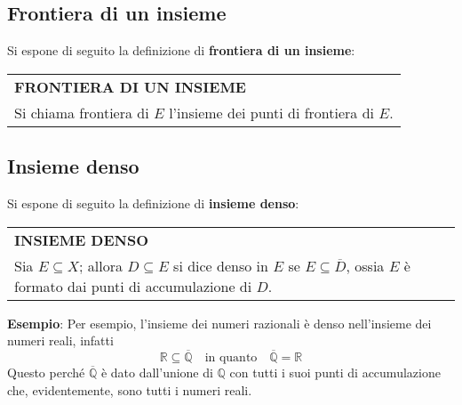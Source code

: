 \documentclass[a4paper]{extarticle}
\renewcommand\arraystretch{}
\begin{document}
\vspace{1em}
\noindent
\subsection{Frontiera di un insieme}
Si espone di seguito la definizione di \textbf{frontiera di un insieme}:

\vspace{1em}
\setlength{\tabcolsep}{14pt}
\renewcommand{\arraystretch}{2}
\noindent
\begin{tabularx}{\textwidth}{@{}|P|@{}}
    \hline
    {\textbf{FRONTIERA DI UN INSIEME}}\\
    \parbox{\linewidth}{Si chiama frontiera di $E$ l'insieme dei punti di frontiera di $E$.
    \vspace{3mm}}\\
    \hline
\end{tabularx}

\newpage
\noindent
\subsection{Insieme denso}
Si espone di seguito la definizione di \textbf{insieme denso}:

\vspace{1em}
\setlength{\tabcolsep}{14pt}
\renewcommand{\arraystretch}{2}
\noindent
\begin{tabularx}{\textwidth}{@{}|P|@{}}
    \hline
    {\textbf{INSIEME DENSO}}\\
    \parbox{\linewidth}{Sia $E \subseteq X$; allora $D \subseteq E$ si dice denso in $E$ se $E \subseteq \overline{D}$, ossia $E$ è formato dai punti di accumulazione di $D$.
    \vspace{3mm}}\\
    \hline
\end{tabularx}

\vspace{2em}
\noindent
\textbf{Esempio}: Per esempio, l'insieme dei numeri razionali è denso nell'insieme dei numeri reali, infatti
\[\mathbb{R} \subseteq \overline{\mathbb{Q}} \hspace{1em} \text{in quanto} \hspace{1em} \overline{\mathbb{Q}} = \mathbb{R}\]
Questo perché $\overline{\mathbb{Q}}$ è dato dall'unione di $\mathbb{Q}$ con tutti i suoi punti di accumulazione che, evidentemente, sono tutti i numeri reali.
\end{document}
